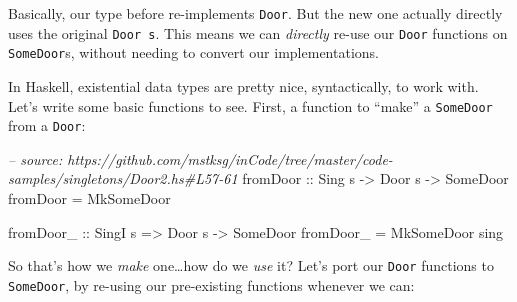 \documentclass[]{article}
\newenvironment{Shaded}{}{}
\newcommand{\KeywordTok}[1]{\textcolor[rgb]{0.00,0.44,0.13}{\textbf{#1}}}
\newcommand{\DataTypeTok}[1]{\textcolor[rgb]{0.56,0.13,0.00}{#1}}
\newcommand{\CommentTok}[1]{\textcolor[rgb]{0.38,0.63,0.69}{\textit{#1}}}
\newcommand{\OtherTok}[1]{\textcolor[rgb]{0.00,0.44,0.13}{#1}}
\newcommand{\FunctionTok}[1]{\textcolor[rgb]{0.02,0.16,0.49}{#1}}
\newcommand{\NormalTok}[1]{#1}
\begin{document}
Basically, our type before re-implements \texttt{Door}. But the new one actually
directly uses the original \texttt{Door\ s}. This means we can \emph{directly}
re-use our \texttt{Door} functions on \texttt{SomeDoor}s, without needing to
convert our implementations.

In Haskell, existential data types are pretty nice, syntactically, to work with.
Let's write some basic functions to see. First, a function to ``make'' a
\texttt{SomeDoor} from a \texttt{Door}:

\begin{Shaded}
\begin{Highlighting}[]
\CommentTok{-- source: https://github.com/mstksg/inCode/tree/master/code-samples/singletons/Door2.hs#L57-61}
\OtherTok{fromDoor ::} \DataTypeTok{Sing}\NormalTok{ s }\OtherTok{->} \DataTypeTok{Door}\NormalTok{ s }\OtherTok{->} \DataTypeTok{SomeDoor}
\NormalTok{fromDoor }\FunctionTok{=} \DataTypeTok{MkSomeDoor}

\OtherTok{fromDoor_ ::} \DataTypeTok{SingI}\NormalTok{ s }\OtherTok{=>} \DataTypeTok{Door}\NormalTok{ s }\OtherTok{->} \DataTypeTok{SomeDoor}
\NormalTok{fromDoor_ }\FunctionTok{=} \DataTypeTok{MkSomeDoor}\NormalTok{ sing}
\end{Highlighting}
\end{Shaded}

So that's how we \emph{make} one\ldots{}how do we \emph{use} it? Let's port our
\texttt{Door} functions to \texttt{SomeDoor}, by re-using our pre-existing
functions whenever we can:

\begin{Shaded}
\end{Shaded}
\end{document}

